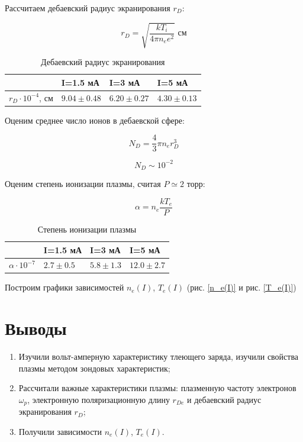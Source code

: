 \documentclass[a4paper, 12pt]{article}
\begin{document}
Рассчитаем дебаевский радиус экранирования $r_D$:

\[r_{D} = \sqrt{\frac{kT_i}{4\pi n_ee^2}}\text{ см}\]

\begin{table}[h!]
\caption{Дебаевский радиус экранирования}
\begin{center}
\begin{tabular}{|l|l|l|l|}
\hline
    & I=1.5 мА & I=3 мА & I=5 мА \\ \hline
$r_{D} \cdot 10^{-4}$, см & $9.04 \pm 0.48$  & $6.20 \pm 0.27$ & $4.30 \pm 0.13$  \\ \hline
\end{tabular}
\end{center}
\label{r_D}
\end{table}

\newpage
Оценим среднее число ионов в дебаевской сфере:

\[N_D = \frac{4}{3}\pi n_er_D^3\]

\[N_D \sim 10^{-2}\]

Оценим степень ионизации плазмы, считая $P \simeq 2$ торр:

\[\alpha = n_e\frac{kT_e}{P}\]

\begin{table}[h!]
\caption{Степень ионизации плазмы}
\begin{center}
\begin{tabular}{|l|l|l|l|}
\hline
    & I=1.5 мА & I=3 мА & I=5 мА \\ \hline
$\alpha \cdot 10^{-7}$ & $2.7 \pm 0.5$  & $5.8 \pm 1.3$ & $12.0 \pm 2.7$  \\ \hline
\end{tabular}
\end{center}
\label{alpha}
\end{table}

Построим графики зависимостей $n_e(I)$,
$T_e(I)$ (рис. \ref{n_e(I)} и рис. \ref{T_e(I)})

\newpage
\section{Выводы}

\begin{enumerate}
\item Изучили вольт-амперную характеристику тлеющего заряда, изучили свойства плазмы методом зондовых характеристик;
\item Рассчитали важные характеристики плазмы: плазменную частоту электронов $\omega_p$,
электронную поляризационную длину $r_{De}$ и дебаевский радиус экранирования $r_D$;
\item Получили зависимости $n_e(I)$,
$T_e(I)$.
\end{enumerate}
\end{document}
